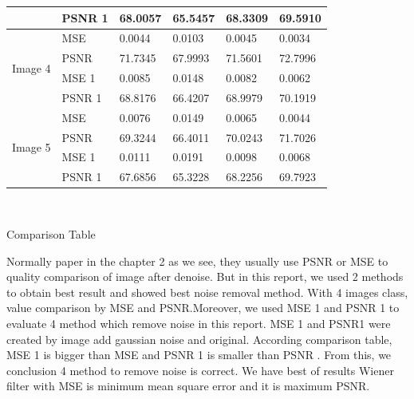 \begin{center}
\begin{tabular}{|l|l|l|l|l|l|l|l|l|l|}
                         & PSNR 1 & \multicolumn{2}{l|}{68.0057} & \multicolumn{2}{l|}{65.5457} & \multicolumn{2}{l|}{68.3309}  & \multicolumn{2}{l|}{69.5910} \\ \hline
\multirow{4}{*}{Image 4} & MSE    & \multicolumn{2}{l|}{0.0044}  & \multicolumn{2}{l|}{0.0103}  & \multicolumn{2}{l|}{0.0045}   & \multicolumn{2}{l|}{0.0034}  \\ \cline{2-10} 
                         & PSNR   & \multicolumn{2}{l|}{71.7345} & \multicolumn{2}{l|}{67.9993} & \multicolumn{2}{l|}{71.5601}  & \multicolumn{2}{l|}{72.7996} \\ \cline{2-10} 
                         & MSE 1  & \multicolumn{2}{l|}{0.0085}  & \multicolumn{2}{l|}{0.0148}  & \multicolumn{2}{l|}{0.0082}   & \multicolumn{2}{l|}{0.0062}  \\ \cline{2-10} 
                         & PSNR 1 & \multicolumn{2}{l|}{68.8176} & \multicolumn{2}{l|}{66.4207} & \multicolumn{2}{l|}{68.9979}  & \multicolumn{2}{l|}{70.1919} \\ \hline
\multirow{4}{*}{Image 5} & MSE    & \multicolumn{2}{l|}{0.0076}  & \multicolumn{2}{l|}{0.0149}  & \multicolumn{2}{l|}{0.0065}   & \multicolumn{2}{l|}{0.0044}  \\ \cline{2-10} 
                         & PSNR   & \multicolumn{2}{l|}{69.3244} & \multicolumn{2}{l|}{66.4011} & \multicolumn{2}{l|}{70.0243}  & \multicolumn{2}{l|}{71.7026} \\ \cline{2-10} 
                         & MSE 1  & \multicolumn{2}{l|}{0.0111}  & \multicolumn{2}{l|}{0.0191}  & \multicolumn{2}{l|}{0.0098}   & \multicolumn{2}{l|}{0.0068}  \\ \cline{2-10} 
                         & PSNR 1 & \multicolumn{2}{l|}{67.6856} & \multicolumn{2}{l|}{65.3228} & \multicolumn{2}{l|}{68.2256}  & \multicolumn{2}{l|}{69.7923} \\ \hline
\end{tabular}

\

Comparison Table
\end{center}
\vspace{1cm}

Normally paper in the chapter 2 as we see, they usually use PSNR or MSE to quality comparison of image after denoise. But in this report, we used 2 methods to obtain best result and showed best noise removal method. With 4 images class, value comparison by MSE and PSNR.Moreover, we used MSE 1 and PSNR 1 to evaluate 4 method which remove noise in this report. MSE 1 and PSNR1 were created by image add gaussian noise and original. According comparison table,  MSE 1 is bigger than MSE and PSNR 1 is smaller than PSNR . From this, we conclusion 4 method to remove noise is correct. We have best of results Wiener filter with MSE is minimum mean square error and it is maximum PSNR.


